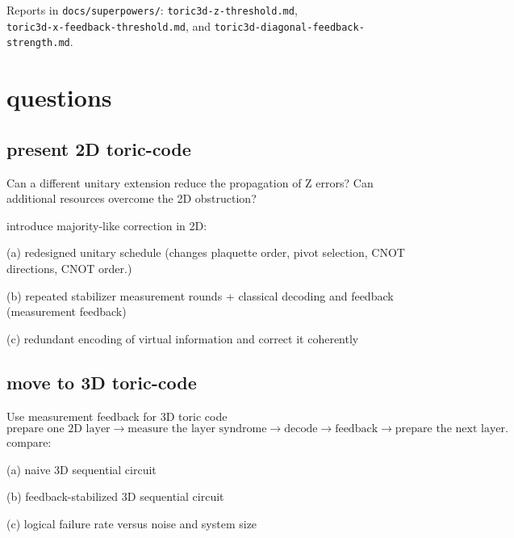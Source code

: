 \documentclass[11pt]{article}
\theoremstyle{definition}
\begin{document}
Reports in \texttt{docs/superpowers/}: \texttt{toric3d-z-threshold.md},\\
\texttt{toric3d-x-feedback-threshold.md}, and
\texttt{toric3d-diagonal-feedback-strength.md}.

\newpage

\section{questions}

\subsection{present 2D toric-code}

Can a different unitary extension reduce the propagation of Z errors? Can additional resources overcome the 2D obstruction?

introduce majority-like correction in 2D:

(a) redesigned unitary schedule (changes plaquette order, pivot selection, CNOT directions, CNOT order.)

(b) repeated stabilizer measurement rounds + classical decoding and feedback (measurement feedback)

(c) redundant encoding of virtual information and correct it coherently


\subsection{move to 3D toric-code}

Use measurement feedback for 3D toric code
\[
\text{prepare one 2D layer}
\rightarrow
\text{measure the layer syndrome}
\rightarrow
\text{decode}
\rightarrow
\text{feedback}
\rightarrow
\text{prepare the next layer}.
\]
compare:

(a) naive 3D sequential circuit

(b) feedback-stabilized 3D sequential circuit

(c) logical failure rate versus noise and system size
\end{document}
